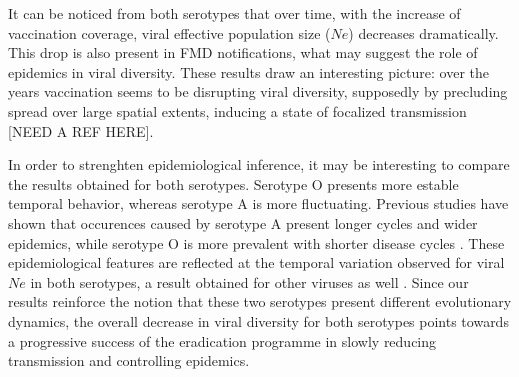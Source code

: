 \documentclass[10pt]{article}
\begin{document}
It can be noticed from both serotypes that over time, with the increase of vaccination coverage, viral effective population size ($Ne$) decreases dramatically.
This drop is also present in FMD notifications, what may suggest the role of epidemics in viral diversity.
These results draw an interesting picture: over the years vaccination seems to be disrupting viral diversity, supposedly by precluding spread over large spatial extents, inducing a state of focalized transmission [NEED A REF HERE].

In order to strenghten epidemiological inference, it may be interesting to compare the results obtained for both serotypes. Serotype O presents more estable temporal behavior, whereas serotype A is more fluctuating.
Previous studies have shown that occurences caused by serotype A present longer cycles and wider epidemics, while serotype O is more prevalent with shorter disease cycles \cite{colombiatime}.
These epidemiological features are reflected at the temporal variation observed for viral $Ne$ in both serotypes, a result obtained for other viruses as well \cite{Bennett2010,Pybus2003}. 
Since our results reinforce the notion that these two serotypes present different evolutionary dynamics, the overall decrease in viral diversity for both serotypes points towards a progressive success of the eradication programme in slowly reducing transmission and controlling epidemics.
\end{document}

